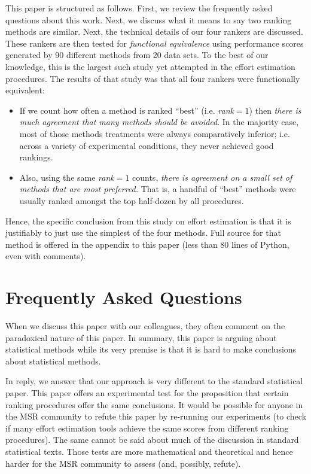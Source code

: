 \documentclass{sig-alternate}
\newcommand{\bi}{\begin{itemize}}
\newcommand{\ei}{\end{itemize}}
\begin{document}
This paper is structured as follows.  First, we
review the frequently asked questions about
 this work.  Next, we discuss what it means to
say two ranking methods are similar.  Next,
the technical details of our four rankers are discussed.
These  rankers are then tested for
 {\em functional equivalence} 
using  performance scores generated
by 90 different methods from 20 data sets. To the best of our knowledge, this
is the largest such study yet attempted in the effort estimation procedures.
The results of that study was that all four rankers were functionally equivalent:
\bi
\item 
If we count how  often a method is ranked ``best'' (i.e. {\em rank}$=1$) 
then
{\em there is much agreement that many methods should be avoided}.  
In the majority case, most of those methods treatments were always comparatively
inferior; i.e. across a variety of experimental conditions, they never
achieved good rankings. 
\item
Also, using the same {\em rank}$=1$ counts,
{\em there is agreement on a small set of methods that are most preferred.}
That is, a handful of ``best''
methods were usually ranked amongst the top half-dozen by all procedures.
\ei
Hence, the
 specific conclusion from this study on
effort estimation is
that it is justifiably
to just use the simplest of the four
methods. Full source for that 
method is offered in the appendix to this paper 
(less than 80
lines of Python, even with comments).

\section{Frequently Asked Questions}

When we discuss this paper with our colleagues,
they often comment  on the  paradoxical nature
 of this paper. In summary, this paper
is arguing about statistical
methods while its very premise is that it is hard to
make conclusions about  statistical methods.

In reply, we answer that our approach is very different to
the standard statistical paper.
This paper offers an experimental
test for the proposition that certain
ranking procedures offer the same conclusions.
It would be possible for anyone in the MSR community to refute
this paper by re-running our experiments (to check if many
effort estimation tools achieve the same scores
from different ranking procedures).
The same cannot be said about  much of the discussion in
standard statistical texts. Those tests are more mathematical and theoretical
and hence harder for the MSR community to assess (and, possibly,
refute).
\end{document}

